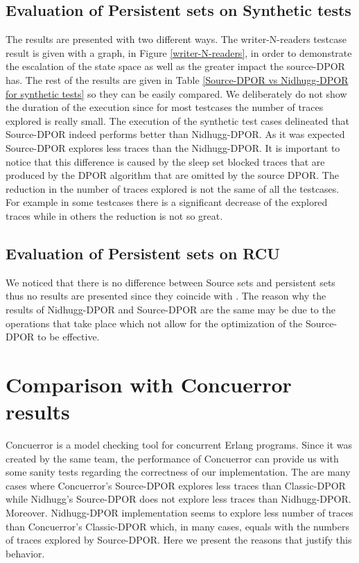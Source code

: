 \subsection{Evaluation of Persistent sets on Synthetic tests}
The results are presented with two different ways. The writer-N-readers testcase result is given with a graph, in Figure
\ref{writer-N-readers}, in order to demonstrate the escalation of the state space as well as the greater impact the
source-DPOR has. The rest of the results are given in Table \ref{Source-DPOR vs Nidhugg-DPOR for synthetic tests} so they can be
easily compared. We deliberately do not show the duration of the execution since for most testcases the number of traces
explored is really small. The execution of the synthetic test cases delineated that Source-DPOR indeed performs better
than Nidhugg-DPOR. As it was expected Source-DPOR explores less traces than the Nidhugg-DPOR. It is important to notice
that this difference is caused by the sleep set blocked traces that are produced by the DPOR algorithm that are omitted
by the source DPOR. The reduction in the number of traces explored is not the same of all the testcases. For example in
some testcases there is a significant decrease of the explored traces while in others the reduction is not so great.



\subsection{Evaluation of Persistent sets on RCU}
We noticed that there is no difference between Source sets and persistent sets thus no results are presented since they
coincide with \cite{Spin}. The reason why the results of Nidhugg-DPOR and Source-DPOR are the same may be due to the operations
that take place which not allow for the optimization of the Source-DPOR to be effective.

\section{Comparison with Concuerror results}
Concuerror is a model checking tool for concurrent Erlang programs. Since it was created by the same team, the performance
of Concuerror can provide us with some sanity tests regarding the correctness of our implementation.
The are many cases where Concuerror's Source-DPOR explores less traces than Classic-DPOR while Nidhugg's Source-DPOR
does not explore less traces than Nidhugg-DPOR. Moreover. Nidhugg-DPOR implementation seems to explore less number of
traces than Concuerror's Classic-DPOR \cite{AbdullaAronisJohnssonSagonasDPOR2014} which, in many cases, equals with the
numbers of traces explored by Source-DPOR. Here we present the reasons that justify this behavior. 

